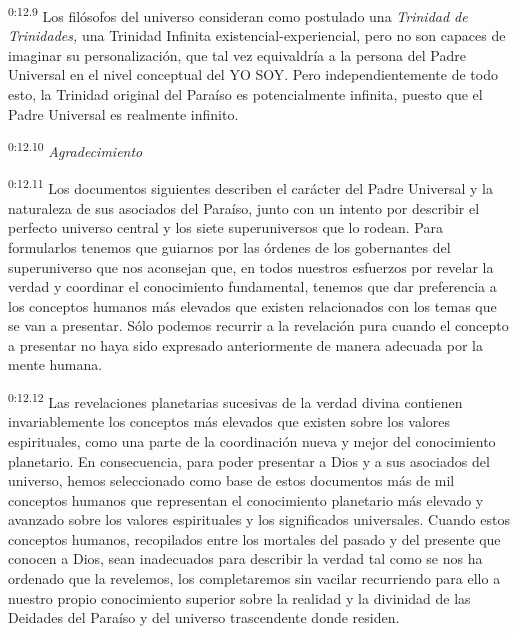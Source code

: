 \par
\textsuperscript{0:12.9} Los filósofos del universo consideran como postulado una \textit{Trinidad de Trinidades,} una Trinidad Infinita existencial-experiencial, pero no son capaces de imaginar su personalización, que tal vez equivaldría a la persona del Padre Universal en el nivel conceptual del YO SOY. Pero independientemente de todo esto, la Trinidad original del Paraíso es potencialmente infinita, puesto que el Padre Universal es realmente infinito.

\par
\textsuperscript{0:12.10} \textit{Agradecimiento}

\par
\textsuperscript{0:12.11} Los documentos siguientes describen el carácter del Padre Universal y la naturaleza de sus asociados del Paraíso, junto con un intento por describir el perfecto universo central y los siete superuniversos que lo rodean. Para formularlos tenemos que guiarnos por las órdenes de los gobernantes del superuniverso que nos aconsejan que, en todos nuestros esfuerzos por revelar la verdad y coordinar el conocimiento fundamental, tenemos que dar preferencia a los conceptos humanos más elevados que existen relacionados con los temas que se van a presentar. Sólo podemos recurrir a la revelación pura cuando el concepto a presentar no haya sido expresado anteriormente de manera adecuada por la mente humana.

\par
\textsuperscript{0:12.12} Las revelaciones planetarias sucesivas de la verdad divina contienen invariablemente los conceptos más elevados que existen sobre los valores espirituales, como una parte de la coordinación nueva y mejor del conocimiento planetario. En consecuencia, para poder presentar a Dios y a sus asociados del universo, hemos seleccionado como base de estos documentos más de mil conceptos humanos que representan el conocimiento planetario más elevado y avanzado sobre los valores espirituales y los significados universales. Cuando estos conceptos humanos, recopilados entre los mortales del pasado y del presente que conocen a Dios, sean inadecuados para describir la verdad tal como se nos ha ordenado que la revelemos, los completaremos sin vacilar recurriendo para ello a nuestro propio conocimiento superior sobre la realidad y la divinidad de las Deidades del Paraíso y del universo trascendente donde residen.

